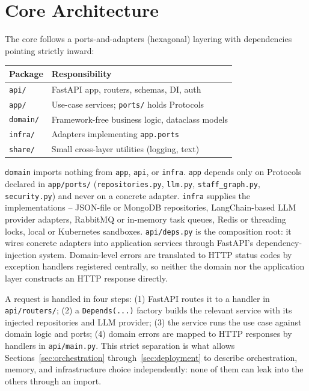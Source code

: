 \documentclass[conference]{IEEEtran}
\begin{document}
\section{Core Architecture}
\label{sec:architecture}

The core follows a ports-and-adapters (hexagonal) layering with
dependencies pointing strictly inward:

\begin{center}
\footnotesize
\begin{tabular}{@{}ll@{}}
\toprule
\textbf{Package} & \textbf{Responsibility} \\
\midrule
\texttt{api/}    & FastAPI app, routers, schemas, DI, auth \\
\texttt{app/}    & Use-case services; \texttt{ports/} holds Protocols \\
\texttt{domain/} & Framework-free business logic, dataclass models \\
\texttt{infra/}  & Adapters implementing \texttt{app.ports} \\
\texttt{share/}  & Small cross-layer utilities (logging, text) \\
\bottomrule
\end{tabular}
\end{center}

\texttt{domain} imports nothing from \texttt{app}, \texttt{api}, or
\texttt{infra}. \texttt{app} depends only on Protocols declared in
\texttt{app/ports/} (\texttt{repositories.py}, \texttt{llm.py},
\texttt{staff\_graph.py}, \texttt{security.py}) and never on a concrete
adapter. \texttt{infra} supplies the implementations -- JSON-file or
MongoDB repositories, LangChain-based LLM provider adapters, RabbitMQ or
in-memory task queues, Redis or threading locks, local or Kubernetes
sandboxes. \texttt{api/deps.py} is the composition root: it wires concrete
adapters into application services through FastAPI's dependency-injection
system. Domain-level errors are translated to HTTP status codes by
exception handlers registered centrally, so neither the domain nor the
application layer constructs an HTTP response directly.

A request is handled in four steps: (1) FastAPI routes it to a handler in
\texttt{api/routers/}; (2) a \texttt{Depends(...)} factory builds the
relevant service with its injected repositories and LLM provider; (3) the
service runs the use case against domain logic and ports; (4) domain
errors are mapped to HTTP responses by handlers in \texttt{api/main.py}.
This strict separation is what allows Sections~\ref{sec:orchestration}
through~\ref{sec:deployment} to describe orchestration, memory, and
infrastructure choice independently: none of them can leak into the
others through an import.
\end{document}
